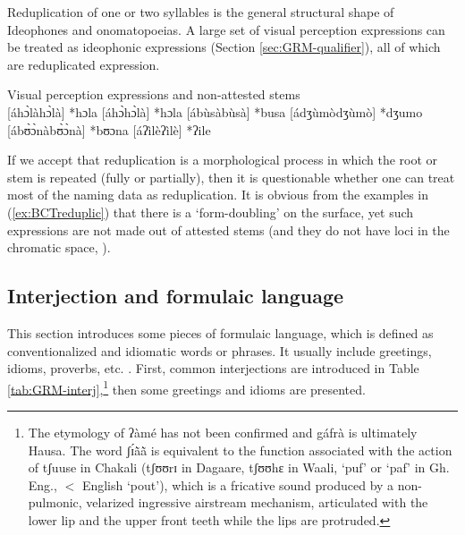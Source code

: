 \begin{exe}
\begin{exe}
\begin{exe}
{\begin{exe}
\begin{exe}
\begin{exe}
\begin{exe}
\begin{exe}
\begin{exe}
\begin{exe}
\begin{exe}
\begin{exe}
\begin{exe}
\begin{exe}
\begin{exe}
\begin{exe}
\begin{exe}
\begin{exe}
\begin{exe}
\begin{exe}
\begin{exe}
\begin{exe}
\begin{exe}
\begin{exe}



Reduplication of one or two syllables is the general 
structural shape of
Ideophones and onomatopoeias. A large set of visual 
perception expressions can be treated as
 ideophonic expressions (Section \ref{sec:GRM-qualifier}), all of which are 
reduplicated expression.  

\ea\label{ex:BCTreduplic}{\rm Visual perception expressions  and 
non-attested stems}\\

	  [áhɔ̀làhɔ̀là]   *hɔla   
		[áhɔ̀hɔ̀là] *hɔla   
	[ábùsàbùsà]	 *busa  
	[ádʒùmòdʒùmò] *dʒumo  
	[ábʊ̀ɔ̀nàbʊ̀ɔ̀nà]		 *bʊɔna  
	[áʔìlèʔìlè]	 *ʔile 

\z
\z


If we accept that reduplication is a morphological process in which the root or 
stem is repeated (fully or partially), then it is questionable whether one can 
treat most of the naming data as reduplication. It is obvious from the examples in 
(\ref{ex:BCTreduplic}) that there is a `form-doubling' on the surface, yet such 
expressions  are not made out of attested stems (and they do not have loci in the chromatic space, 
\citealt[see][]{brin16}).  


\subsection{Interjection and formulaic language}
\label{sec:GRM-greet}


This section introduces some pieces of formulaic language, which is defined as
conventionalized and idiomatic words or phrases. It usually include greetings,
idioms, proverbs,  etc. \citep{Wray05}. First, common
interjections are introduced in Table \ref{tab:GRM-interj},\footnote{The 
etymology
of {\sls ʔàmé} has not been confirmed and {\sls gáfrà} is ultimately Hausa. 
The word
{\sls ʃɪ́ã̀ã̀} is equivalent to the
function  associated with the action of {\sls tʃuuse} in Chakali ({\sls tʃʊʊrɪ} 
in
Dagaare, {\sls tʃʊʊhɛ} in Waali, `puf' or `paf'  in Gh.  Eng.,   $<$
English `pout'), which
is a
fricative sound produced by a non-pulmonic, velarized ingressive airstream
mechanism, articulated with the lower lip and the upper front teeth while the
lips are protruded.} then some greetings and idioms are presented. 




\end{exe}
\end{exe}
\end{exe}
\end{exe}
\end{exe}
\end{exe}
\end{exe}
\end{exe}
\end{exe}
\end{exe}
\end{exe}
\end{exe}
\end{exe}
\end{exe}
\end{exe}
\end{exe}
\end{exe}
\end{exe}
\end{exe}
\end{exe}
\end{exe}}
\end{exe}
\end{exe}
\end{exe}
